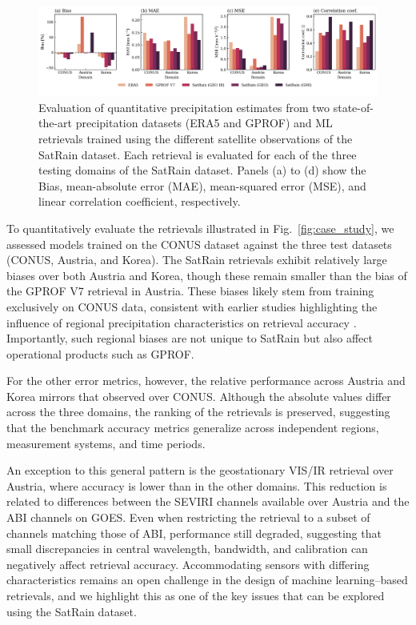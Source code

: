 \documentclass[11pt]{article}
\begin{document}
\begin{figure}[htbp] %
	\centering
	\includegraphics[width=1.0\textwidth]{figures/fig10}
	\caption{
	Evaluation of quantitative precipitation estimates from two state-of-the-art
	precipitation datasets (ERA5 and GPROF) and ML retrievals trained using the
	different satellite observations of the SatRain dataset. Each retrieval is
	evaluated for each of the three testing domains of the SatRain dataset. Panels
	(a) to (d) show the Bias, mean-absolute error (MAE), mean-squared error (MSE),
	and linear correlation coefficient, respectively.
	}
	\label{fig:sensor_comparison}
\end{figure}

To quantitatively evaluate the retrievals illustrated in Fig.~\ref{fig:case_study}, we assessed models trained on the CONUS dataset against the three test datasets (CONUS, Austria, and Korea). The SatRain retrievals exhibit relatively large biases over both Austria and Korea, though these remain smaller than the bias of the GPROF V7 retrieval in Austria. These biases likely stem from training exclusively on CONUS data, consistent with earlier studies highlighting the influence of regional precipitation characteristics on retrieval accuracy \citep{Sohn2013WarmRain}. Importantly, such regional biases are not unique to SatRain but also affect operational products such as GPROF.

For the other error metrics, however, the relative performance across Austria and Korea mirrors that observed over CONUS. Although the absolute values differ across the three domains, the ranking of the retrievals is preserved, suggesting that the benchmark accuracy metrics generalize across independent regions, measurement systems, and time periods.

An exception to this general pattern is the geostationary VIS/IR retrieval over Austria, where accuracy is lower than in the other domains. This reduction is related to differences between the SEVIRI channels available over Austria and the ABI channels on GOES. Even when restricting the retrieval to a subset of channels matching those of ABI, performance still degraded, suggesting that small discrepancies in central wavelength, bandwidth, and calibration can negatively affect retrieval accuracy. Accommodating sensors with differing characteristics remains an open challenge in the design of machine learning–based retrievals, and we highlight this as one of the key issues that can be explored using the SatRain dataset.
\end{document}
